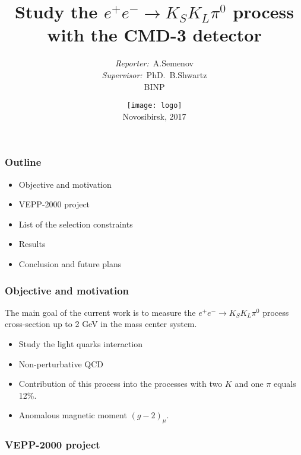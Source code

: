 \documentclass[14pt, hyperref = {colorlinks}]{beamer}
\title{\small{Study the $e^{+}e^{-} \to K_{S}K_{L}\pi^{0}$ process with the CMD-3 detector}}
\author{\small{%
\emph{Reporter:}~A.Semenov\\%
\emph{Supervisor:}~PhD.~B.Shwartz}\\%
\vspace{30pt}%
BINP
\vspace{0pt}%
}
\date{\texttt{[image: logo]} \\
\vspace{20pt}%
\small{Novosibirsk, 2017}}
\begin{document}
\maketitle
\small
\begin{frame}
\frametitle{Outline}\label{t1}
\begin{itemize}
  \item Objective and motivation
  \item VEPP-2000 project
  \item List of the selection constraints
  \item Results
  \item Conclusion and future plans
\end{itemize}
\end{frame}

\begin{frame}
\frametitle{Objective and motivation}\label{t1}
The main goal of the current work is to measure the $e^{+}e^{-} \to K_{S}K_{L}\pi^{0}$ process cross-section up to 2 GeV in the mass center system.
\begin{itemize}
  \item Study the light quarks interaction
  \item Non-perturbative QCD
  \item Contribution of this process into the processes with two $K$ and one $\pi$ equals 12\%.
  \item Anomalous magnetic moment {$(g-2)_\mu$}.
\end{itemize}
\end{frame}

\begin{frame}
\frametitle{VEPP-2000 project}
\begin{figure}[h]
\begin{minipage}[h]{0.49\linewidth}   
\end{minipage}
\begin{minipage}[h]{0.49\linewidth}
\end{minipage}
\hfill
\end{figure}
\end{frame}
\end{document}
